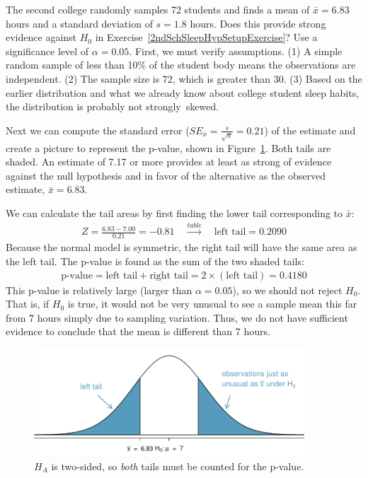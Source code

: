 \begin{example}{The second college randomly samples 72 students and finds a mean of $\bar{x} = 6.83$ hours and a standard deviation of $s=1.8$ hours. Does this provide strong evidence against $H_0$ in Exercise~\ref{2ndSchSleepHypSetupExercise}? Use a significance level of $\alpha=0.05$.}
First, we must verify assumptions. (1) A simple random sample of less than 10\% of the student body means the observations are independent. (2) The sample size is 72, which is greater than 30. (3) Based on the earlier distribution and what we already know about college student sleep habits, the distribution is probably not strongly~skewed.

Next we can compute the standard error ($SE_{\bar{x}} = \frac{s}{\sqrt{n}} = 0.21$) of the estimate and create a picture to represent the p-value, shown in Figure~\ref{2ndSchSleepHTExample}. Both tails are shaded. An estimate of 7.17 or more provides at least as strong of evidence against the null hypothesis and in favor of the alternative as the observed estimate, $\bar{x} = 6.83$.

We can calculate the tail areas by first finding the lower tail corresponding to $\bar{x}$:
\begin{eqnarray*}
Z = \frac{6.83 - 7.00}{0.21} = -0.81 \quad\stackrel{table}{\rightarrow}\quad \text{left tail}=0.2090
\end{eqnarray*}
Because the normal model is symmetric, the right tail will have the same area as the left tail. The p-value is found as the sum of the two shaded tails:
\begin{eqnarray*}
\text{p-value} = \text{left tail} + \text{right tail} = 2\times(\text{left tail}) = 0.4180
\end{eqnarray*}
This p-value is relatively large (larger than $\alpha=0.05$), so we should not reject $H_0$. That is, if $H_0$ is true, it would not be very unusual to see a sample mean this far from 7 hours simply due to sampling variation. Thus, we do not have sufficient evidence to conclude that the mean is different than 7 hours.


\begin{figure}
   \centering
   \includegraphics[width=0.9\textwidth]{ch_inference_foundations/figures/2ndSchSleepHTExample/2ndSchSleepHTExample}
   \caption{$H_A$ is two-sided, so \emph{both} tails must be counted for the p-value.}
   \label{2ndSchSleepHTExample}
\end{figure}

\end{example}

